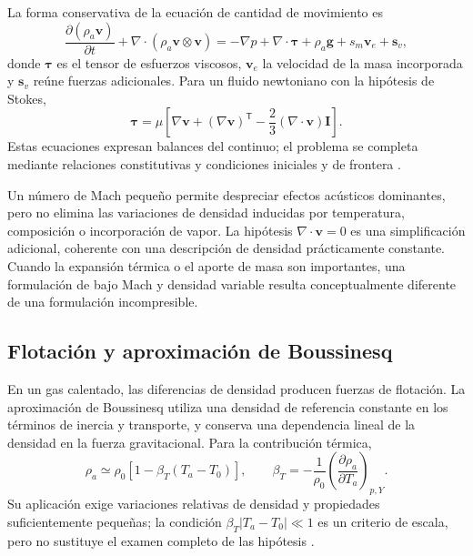 La forma conservativa de la ecuación de cantidad de movimiento es
\begin{equation}
\frac{\partial(\rho_a\mathbf v)}{\partial t}
+\nabla\cdot(\rho_a\mathbf v\otimes\mathbf v)
=-\nabla p+\nabla\cdot\boldsymbol\tau+\rho_a\mathbf g
+s_m\mathbf v_e+\mathbf s_v,
\label{eq:navierstokes}
\end{equation}
donde $\boldsymbol\tau$ es el tensor de esfuerzos viscosos, $\mathbf v_e$ la velocidad de la masa incorporada y $\mathbf s_v$ reúne fuerzas adicionales. Para un fluido newtoniano con la hipótesis de Stokes,
\begin{equation}
\boldsymbol\tau=
\mu\left[\nabla\mathbf v+(\nabla\mathbf v)^{\mathsf T}
-\frac{2}{3}(\nabla\cdot\mathbf v)\mathbf I\right].
\label{eq:esfuerzo_newtoniano}
\end{equation}
Estas ecuaciones expresan balances del continuo; el problema se completa mediante relaciones constitutivas y condiciones iniciales y de frontera \cite{versteeg2007,patankar1980}.

Un número de Mach pequeño permite despreciar efectos acústicos dominantes, pero no elimina las variaciones de densidad inducidas por temperatura, composición o incorporación de vapor. La hipótesis $\nabla\cdot\mathbf v=0$ es una simplificación adicional, coherente con una descripción de densidad prácticamente constante. Cuando la expansión térmica o el aporte de masa son importantes, una formulación de bajo Mach y densidad variable resulta conceptualmente diferente de una formulación incompresible.

\subsection{Flotación y aproximación de Boussinesq}

En un gas calentado, las diferencias de densidad producen fuerzas de flotación. La aproximación de Boussinesq utiliza una densidad de referencia constante en los términos de inercia y transporte, y conserva una dependencia lineal de la densidad en la fuerza gravitacional. Para la contribución térmica,
\begin{equation}
\rho_a\simeq\rho_0\left[1-\beta_T(T_a-T_0)\right],
\qquad
\beta_T=-\frac{1}{\rho_0}
\left(\frac{\partial\rho_a}{\partial T_a}\right)_{p,Y}.
\label{eq:boussinesq}
\end{equation}
Su aplicación exige variaciones relativas de densidad y propiedades suficientemente pequeñas; la condición $\beta_T|T_a-T_0|\ll1$ es un criterio de escala, pero no sustituye el examen completo de las hipótesis \cite{gray1976}.

